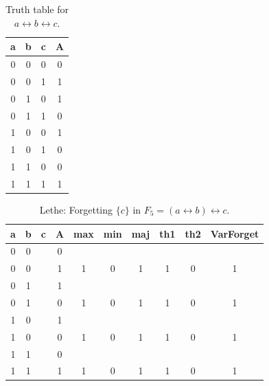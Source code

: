 \begin{table}[!tb]
    \centering
    \begin{tabular}{|c|c|c|c|}
        \hline
        \textbf{a} & \textbf{b} & \textbf{c} & \textbf{A} \\ \hline
        0 & 0 & 0 & 0 \\ \hline
        0 & 0 & 1 & 1 \\ \hline
        0 & 1 & 0 & 1 \\ \hline
        0 & 1 & 1 & 0 \\ \hline
        1 & 0 & 0 & 1 \\ \hline
        1 & 0 & 1 & 0 \\ \hline
        1 & 1 & 0 & 0 \\ \hline
        1 & 1 & 1 & 1 \\ \hline
    \end{tabular}
    \caption{Truth table for $a \leftrightarrow b \leftrightarrow c$.}
    \label{tab:truthtab}
\end{table}

\begin{table}[!tb]
    \centering
    \begin{tabular}{|c|c|c|c|c|c|c|c|c|c|}
        \hline
        \textbf{a} & \textbf{b} & \textbf{c} & \textbf{A} & \textbf{max} & \textbf{min} & \textbf{maj} & \textbf{th1} & \textbf{th2} & \textbf{VarForget} \\ \hline
        \rowcolor{gray!40} 0 & 0 &  & 0 &  &  &  &  &  &  \\ \hline
        \rowcolor{gray!40} 0 & 0 &  & 1 & 1 & 0 & 1 & 1 & 0 & 1 \\ \hline
        \rowcolor{blue!40} 0 & 1 &  & 1 &  &  &  &  &  &  \\ \hline
        \rowcolor{blue!40} 0 & 1 &  & 0 & 1 & 0 & 1 & 1 & 0 & 1 \\ \hline
        \rowcolor{red!40} 1 & 0 &  & 1 &  &  &  &  &  &  \\ \hline
        \rowcolor{red!40} 1 & 0 &  & 0 & 1 & 0 & 1 & 1 & 0 & 1 \\ \hline
        \rowcolor{green!40} 1 & 1 &  & 0 &  &  &  &  &  &  \\ \hline
        \rowcolor{green!40} 1 & 1 &  & 1 & 1 & 0 & 1 & 1 & 0 & 1 \\ \hline
    \end{tabular}
    \caption{Lethe: Forgetting $\{c\}$ in $F_{5} = (a \leftrightarrow b) \leftrightarrow c$.}
    \label{tab:lethe-F5-c}
\end{table}
